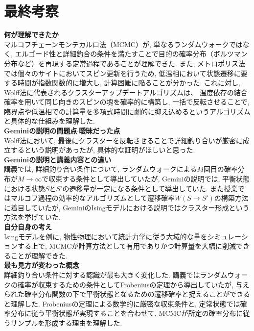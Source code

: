 \documentclass[a4paper,10.5pt]{jlreq}
\begin{document}
\newpage

\section{最終考察}
\large{\textbf{何が理解できたか}}\\
マルコフチェーンモンテカルロ法（MCMC）が, 単なるランダムウォークではなく, 
エルゴード性と詳細釣合の条件を満たすことで目的の確率分布（ボルツマン分布など）を再現する定常過程であることが理解できた. 
また, メトロポリス法では個々のサイトにおいてスピン更新を行うため, 低温相において状態遷移に要する時間が指数関数的に増大し, 
計算困難に陥ることが分かった. これに対し, Wolff法に代表されるクラスターアップデートアルゴリズムは、
温度依存の結合確率を用いて同じ向きのスピンの塊を確率的に構築し, 一括で反転させることで, 
臨界点や低温相での計算量を多項式時間に劇的に抑え込めるというアルゴリズムと具体的な仕組みを理解した. \\

\large{\textbf{Geminiの説明の問題点$\cdot$曖昧だった点}}\\
Wolff法において, 最後にクラスターを反転させることで詳細釣り合いが厳密に成立するという説明があったが, 具体的な証明がほしいと思った.\\

\large{\textbf{Geminiの説明と講義内容との違い}}\\
講義では, 詳細釣り合い条件について, ランダムウォークによる$M$回目の確率分布が$M\rightarrow \infty$で収束する条件として導出していたが, 
Geminiの説明では, 平衡状態における状態$S$と$S'$の遷移量が一定になる条件として導出していた. 
また授業ではマルコフ過程の効率的なアルゴリズムとして遷移確率$W(S\rightarrow S')$の構築方法に着目していたが, 
GeminiのIsingモデルにおける説明ではクラスター形成という方法を挙げていた.\\

\large{\textbf{自分自身の考え}}\\
Isingモデルを例に, 物性物理において統計力学に従う大域的な量をシミュレーションする上で, 
MCMCが計算方法として有用でありかつ計算量を大幅に削減できることが理解できた.\\

\large{\textbf{最も見方が変わった概念}}\\
詳細釣り合い条件に対する認識が最も大きく変化した. 講義ではランダムウォークの確率が収束するための条件としてFrobeniusの定理から導出していたが, 
与えられた確率分布関数の下で平衡状態となるための遷移確率と捉えることができると理解した. 
Frobeniusの定理による数学的に厳密な収束条件と, 定常状態では確率分布に従う平衡状態が実現することを合わせて, MCMCが所定の確率分布に従うサンプルを形成する理由を理解した.
\end{document}
